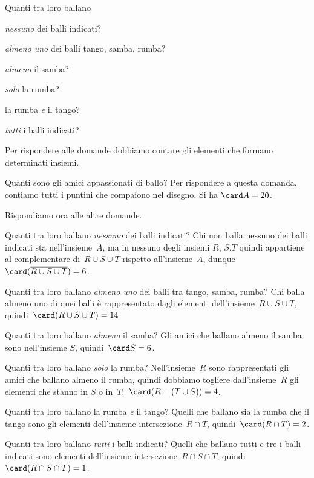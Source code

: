 {\begin{esempio}
\begin{minipage}{.59 \textwidth}
Quanti tra loro ballano
\begin{enumeratea}
\item \emph{nessuno} dei balli indicati?
\item \emph{almeno uno} dei balli tango, samba, rumba?
\item \emph{almeno} il samba?
\item \emph{solo} la rumba?
\item la rumba \emph{e} il tango?
\item \emph{tutti} i balli indicati?
\end{enumeratea}
\end{minipage}
\hfill
\begin{minipage}{.39 \textwidth}
\begin{center}
 
\end{center}
\end{minipage}

Per rispondere alle domande dobbiamo contare gli elementi che formano 
determinati insiemi.

Quanti sono gli amici appassionati di ballo? Per rispondere a questa
domanda, contiamo tutti i puntini che compaiono nel disegno. Si ha 
\(\card A=20\).

Rispondiamo ora alle altre domande.
\begin{enumeratea}
 \item Quanti tra loro ballano \emph{nessuno} dei balli indicati?
Chi non balla nessuno dei balli indicati sta nell'insieme~\(A\), ma in 
nessuno degli insiemi \(R\), \(S\),\(T\) quindi appartiene al complementare
di~\(R\cup S\cup T\) rispetto all'insieme~\(A\),
dunque~\(\card (\overline{{R\cup S\cup T}})=6\).
 \item Quanti tra loro ballano \emph{almeno uno} dei balli tra tango, 
samba, rumba? Chi balla almeno uno di quei balli è rappresentato dagli 
elementi
dell'insieme~\(R\cup S\cup T\), quindi~\(\card(R\cup S\cup T)=14\).
 \item Quanti tra loro ballano \emph{almeno} il samba?
Gli amici che ballano almeno il samba sono nell'insieme
\(S\), quindi~\(\card S=6\).
 \item Quanti tra loro ballano \emph{solo} la rumba? Nell'insieme~\(R\) 
sono rappresentati gli amici che ballano almeno il rumba, quindi dobbiamo 
togliere dall'insieme~\(R\) gli elementi che stanno 
in \(S\) o in~\(T\):~\(\card(R-(T\cup S))=4\).
 \item Quanti tra loro ballano la rumba \emph{e} il tango? 
Quelli che ballano sia la rumba che il tango sono gli elementi
dell'insieme intersezione~\(R\cap T\), quindi~\(\card(R\cap T)=2\).
 \item Quanti tra loro ballano \emph{tutti} i balli indicati? 
Quelli che ballano tutti e tre i balli indicati sono elementi
dell'insieme intersezione~\(R\cap S\cap T\), 
quindi~\(\card(R\cap S\cap T)=1\).
\end{enumeratea}


\end{esempio}}
